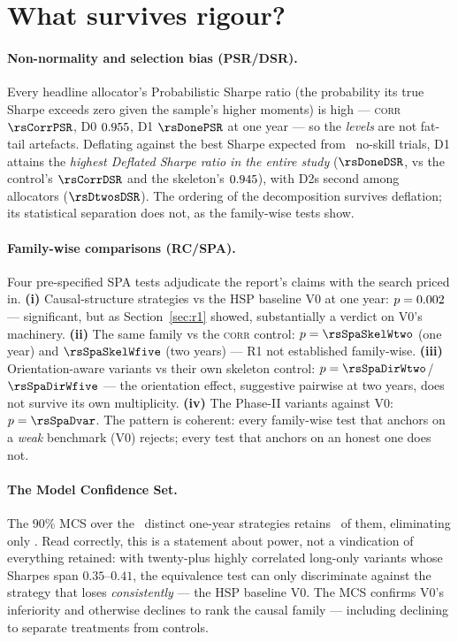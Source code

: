 \section{What survives rigour?}
\label{sec:believe-rigour}


\paragraph{Non-normality and selection bias (PSR/DSR).} Every headline
allocator's Probabilistic Sharpe ratio (the probability its true Sharpe
exceeds zero given the sample's higher moments) is high --- \textsc{corr}
$\rsCorrPSR$, D0 $0.955$, D1 $\rsDonePSR$ at one year --- so the
\emph{levels} are not fat-tail artefacts. Deflating against the best Sharpe
expected from \rsNtrials\ no-skill trials, D1 attains the \emph{highest
Deflated Sharpe ratio in the entire study} ($\rsDoneDSR$, vs the control's
$\rsCorrDSR$ and the skeleton's $0.945$), with D2s second among
allocators ($\rsDtwosDSR$). The ordering of the decomposition survives
deflation; its statistical separation does not, as the family-wise tests
show.

\paragraph{Family-wise comparisons (RC/SPA).} Four pre-specified SPA tests
adjudicate the report's claims with the search priced in. \textbf{(i)}
Causal-structure strategies vs the HSP baseline V0 at one year:
$p=0.002$ --- significant, but as Section~\ref{sec:r1} showed,
substantially a verdict on V0's machinery. \textbf{(ii)} The same family vs
the \textsc{corr} control: $p=\rsSpaSkelWtwo$ (one year) and
$\rsSpaSkelWfive$ (two years) --- R1 not established family-wise.
\textbf{(iii)} Orientation-aware variants vs their own skeleton control:
$p=\rsSpaDirWtwo$/$\rsSpaDirWfive$ --- the orientation effect, suggestive
pairwise at two years, does not survive its own multiplicity.
\textbf{(iv)} The Phase-II variants against V0: $p=\rsSpaDvar$. The pattern
is coherent: every family-wise test that anchors on a \emph{weak} benchmark
(V0) rejects; every test that anchors on an honest one does not.

\paragraph{The Model Confidence Set.} The $90\%$ MCS over the
\rsMcsUniverse\ distinct one-year strategies retains \rsMcsSize\ of them,
eliminating only \rsMcsExcluded. Read correctly, this is a statement about
power, not a vindication of everything retained: with twenty-plus highly
correlated long-only variants whose Sharpes span $0.35$--$0.41$, the
equivalence test can only discriminate against the strategy that loses
\emph{consistently} --- the HSP baseline V0. The MCS confirms V0's
inferiority and otherwise declines to rank the causal family --- including
declining to separate treatments from controls.

